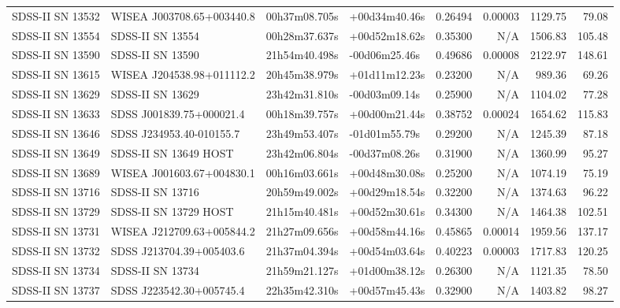 \begin{longtable}{llllrrrr}
SDSS-II SN 13532 &       WISEA J003708.65+003440.8 &   00h37m08.705s &   +00d34m40.46s &  0.26494 &  0.00003 &  1129.75 &       79.08 \\
SDSS-II SN 13554 &                SDSS-II SN 13554 &   00h28m37.637s &   +00d52m18.62s &  0.35300 &      N/A &  1506.83 &      105.48 \\
SDSS-II SN 13590 &                SDSS-II SN 13590 &   21h54m40.498s &   -00d06m25.46s &  0.49686 &  0.00008 &  2122.97 &      148.61 \\
SDSS-II SN 13615 &       WISEA J204538.98+011112.2 &   20h45m38.979s &   +01d11m12.23s &  0.23200 &      N/A &   989.36 &       69.26 \\
SDSS-II SN 13629 &                SDSS-II SN 13629 &   23h42m31.810s &   -00d03m09.14s &  0.25900 &      N/A &  1104.02 &       77.28 \\
SDSS-II SN 13633 &        SDSS J001839.75+000021.4 &   00h18m39.757s &   +00d00m21.44s &  0.38752 &  0.00024 &  1654.62 &      115.83 \\
SDSS-II SN 13646 &        SDSS J234953.40-010155.7 &   23h49m53.407s &   -01d01m55.79s &  0.29200 &      N/A &  1245.39 &       87.18 \\
SDSS-II SN 13649 &           SDSS-II SN 13649 HOST &   23h42m06.804s &   -00d37m08.26s &  0.31900 &      N/A &  1360.99 &       95.27 \\
SDSS-II SN 13689 &       WISEA J001603.67+004830.1 &   00h16m03.661s &   +00d48m30.08s &  0.25200 &      N/A &  1074.19 &       75.19 \\
SDSS-II SN 13716 &                SDSS-II SN 13716 &   20h59m49.002s &   +00d29m18.54s &  0.32200 &      N/A &  1374.63 &       96.22 \\
SDSS-II SN 13729 &           SDSS-II SN 13729 HOST &   21h15m40.481s &   +00d52m30.61s &  0.34300 &      N/A &  1464.38 &      102.51 \\
SDSS-II SN 13731 &       WISEA J212709.63+005844.2 &   21h27m09.656s &   +00d58m44.16s &  0.45865 &  0.00014 &  1959.56 &      137.17 \\
SDSS-II SN 13732 &        SDSS J213704.39+005403.6 &   21h37m04.394s &   +00d54m03.64s &  0.40223 &  0.00003 &  1717.83 &      120.25 \\
SDSS-II SN 13734 &                SDSS-II SN 13734 &   21h59m21.127s &   +01d00m38.12s &  0.26300 &      N/A &  1121.35 &       78.50 \\
SDSS-II SN 13737 &        SDSS J223542.30+005745.4 &   22h35m42.310s &   +00d57m45.43s &  0.32900 &      N/A &  1403.82 &       98.27 \\

\end{longtable}
